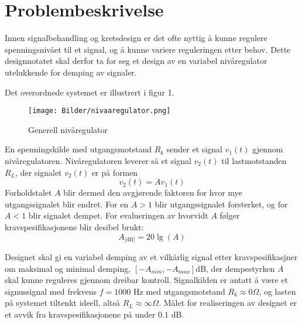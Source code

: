 \section{Problembeskrivelse}
\label{problemBeskrivelse}

Innen signalbehandling og kretsdesign er det ofte nyttig å kunne regulere spenningsnivået til et signal, og å kunne
variere reguleringen etter behov. Dette designnotatet skal derfor ta for seg et design av en variabel nivåregulator utelukkende 
for demping av signaler.

Det overordnede systemet er illustrert i figur 1.

\begin{figure}[H]
    \centering
    \texttt{[image: Bilder/nivaaregulator.png]}
    \caption{Generell nivåregulator \cite{teknot}}
    \label{fig:nivaaregulator}
\end{figure}

En spenningskilde med utgangsmotstand $R_k$ sender et signal $v_1(t)$ gjennom nivåregulatoren.
Nivåregulatoren leverer så et signal $v_2(t)$ til lastmotstanden $R_L$, der signalet $v_2(t)$ er på formen
\[
    v_2(t) = Av_1(t)
\]
Forholdstalet $A$ blir dermed den avgjørende faktoren for hvor mye utgangssignalet blir endret. For en $A > 1$ blir 
utgangssignalet forsterket, og for $A < 1$ blir signalet dempet. For evalueringen av hvorvidt $A$ følger kravspesifikasjonene 
blir desibel brukt:
\[
    A_\text{[dB]} = 20\lg{(A)}
\]

Designet skal gi en variabel demping av et vilkårlig signal etter kravspesifikasjner om 
maksimal og minimal demping, $[-A_{min}, -A_{max}]$dB,
der dempestyrken $A$ skal kunne reguleres gjennom dreibar kontroll. Signalkilden er antatt å være 
et signussignal med frekvens $f = 1000$ Hz med utgangsmotstand $R_k \approx 0\Omega$, og lasten på systemet tiltenkt ideell, altså 
$R_L \approx \infty\Omega$. Målet for realiseringen av designet er et avvik fra kravspesifikasjonene på under $0.1$ dB.
